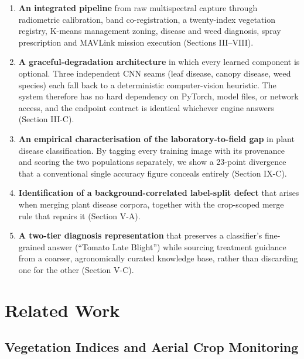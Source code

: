 \documentclass[conference]{IEEEtran}
\begin{document}
\begin{enumerate}
\item \textbf{An integrated pipeline} from raw multispectral capture through
radiometric calibration, band co-registration, a twenty-index vegetation
registry, K-means management zoning, disease and weed diagnosis, spray
prescription and MAVLink mission execution (Sections III--VIII).

\item \textbf{A graceful-degradation architecture} in which every learned
component is optional. Three independent CNN seams (leaf disease, canopy
disease, weed species) each fall back to a deterministic computer-vision
heuristic. The system therefore has no hard dependency on PyTorch, model
files, or network access, and the endpoint contract is identical whichever
engine answers (Section III-C).

\item \textbf{An empirical characterisation of the laboratory-to-field gap} in
plant disease classification. By tagging every training image with its
provenance and scoring the two populations separately, we show a 23-point
divergence that a conventional single accuracy figure conceals entirely
(Section IX-C).

\item \textbf{Identification of a background-correlated label-split defect}
that arises when merging plant disease corpora, together with the crop-scoped
merge rule that repairs it (Section V-A).

\item \textbf{A two-tier diagnosis representation} that preserves a
classifier's fine-grained answer (``Tomato Late Blight'') while sourcing
treatment guidance from a coarser, agronomically curated knowledge base, rather
than discarding one for the other (Section V-C).
\end{enumerate}

\section{Related Work}

\subsection{Vegetation Indices and Aerial Crop Monitoring}
\end{document}
